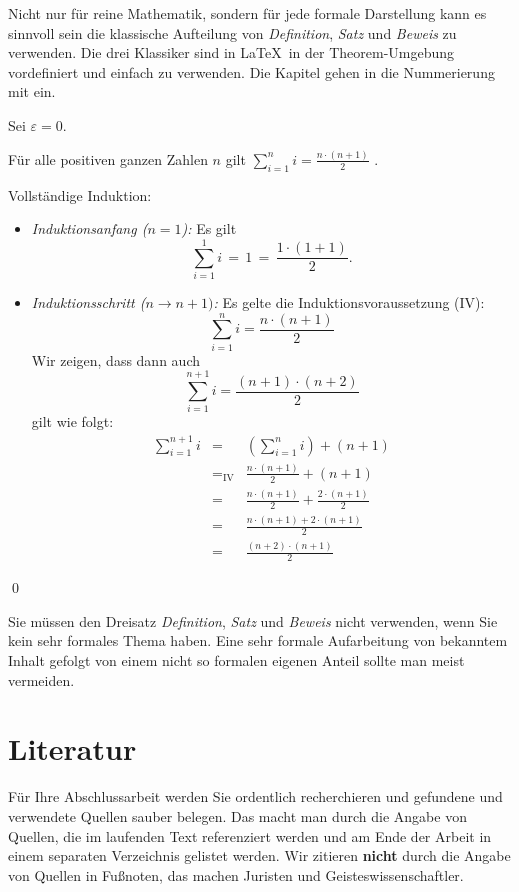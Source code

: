 \documentclass[11pt,a4paper]{report}
\begin{document}
Nicht nur für reine Mathematik, sondern für jede formale
Darstellung kann es sinnvoll sein die klassische Aufteilung
von \emph{Definition}, \emph{Satz} und \emph{Beweis}
zu verwenden. 
Die drei Klassiker sind in \LaTeX\ in der Theorem-Umgebung 
vordefiniert und einfach zu verwenden.
Die Kapitel gehen in die Nummerierung mit ein.

\begin{definition}
Sei $\varepsilon = 0$.
\end{definition}

\begin{satz}
Für alle positiven ganzen Zahlen $n$ gilt 
$\sum_{i=1}^n i = \frac{n \cdot (n+1)}{2}$ \enspace.
\end{satz}
\begin{beweis}
Vollständige Induktion:
\begin{itemize}
\item \emph{Induktionsanfang ($n=1$):} Es gilt  
\[
  \sum_{i=1}^1 i \, = \, 1 \, = \, \frac{1 \cdot (1+1)}{2}.
\]
\item \emph{Induktionsschritt ($n \rightarrow n+1)$:}
Es gelte die Induktionsvoraussetzung (IV):
\[
\sum_{i=1}^n i = \frac{n \cdot (n+1)}{2}
\]
Wir zeigen, dass dann auch 
\[
\sum_{i=1}^{n+1} i = \frac{(n+1) \cdot (n+2)}{2}
\]
gilt wie folgt:
\begin{eqnarray*}
  \sum_{i=1}^{n+1} i 
  & = & (\sum_{i=1}^{n} i) + (n+1)  \\
  & =_{\mbox{IV}} & \frac{n \cdot (n+1)}{2} + (n+1) \\
  & = & \frac{n \cdot (n+1)}{2} + \frac{2 \cdot (n+1)}{2} \\
  & = & \frac{n \cdot (n+1) + 2 \cdot (n+1)}{2} \\
  & = & \frac{(n+2) \cdot (n+1)}{2} 
\end{eqnarray*}
\end{itemize}
\qed
\end{beweis}
Sie müssen den Dreisatz 
\emph{Definition}, \emph{Satz} und \emph{Beweis} nicht verwenden, 
wenn Sie kein sehr formales Thema haben. 
Eine sehr formale Aufarbeitung von bekanntem Inhalt gefolgt 
von einem nicht so formalen eigenen Anteil sollte man 
meist vermeiden.


\section{Literatur}

Für Ihre Abschlussarbeit werden Sie ordentlich recherchieren
und gefundene und verwendete Quellen sauber belegen. 
Das macht man durch die Angabe von Quellen, die im laufenden 
Text referenziert werden und am Ende der Arbeit in einem
separaten Verzeichnis gelistet werden. 
Wir zitieren \textbf{nicht} durch die Angabe von Quellen
in Fußnoten, das machen Juristen und Geisteswissenschaftler.
\end{document}

